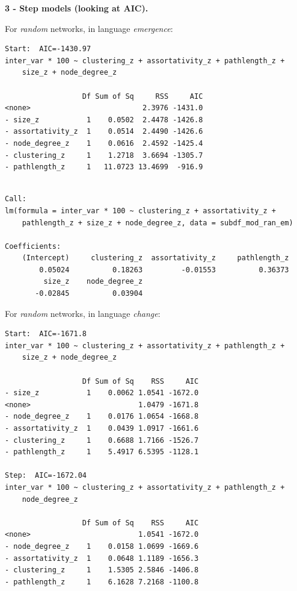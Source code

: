 \documentclass[
]{article}
\begin{document}
\textbf{3 - Step models (looking at AIC).}

For \emph{random} networks, in language \emph{emergence}:

\begin{verbatim}
Start:  AIC=-1430.97
inter_var * 100 ~ clustering_z + assortativity_z + pathlength_z + 
    size_z + node_degree_z

                  Df Sum of Sq     RSS     AIC
<none>                          2.3976 -1431.0
- size_z           1    0.0502  2.4478 -1426.8
- assortativity_z  1    0.0514  2.4490 -1426.6
- node_degree_z    1    0.0616  2.4592 -1425.4
- clustering_z     1    1.2718  3.6694 -1305.7
- pathlength_z     1   11.0723 13.4699  -916.9
\end{verbatim}

\begin{verbatim}

Call:
lm(formula = inter_var * 100 ~ clustering_z + assortativity_z + 
    pathlength_z + size_z + node_degree_z, data = subdf_mod_ran_em)

Coefficients:
    (Intercept)     clustering_z  assortativity_z     pathlength_z  
        0.05024          0.18263         -0.01553          0.36373  
         size_z    node_degree_z  
       -0.02845          0.03904  
\end{verbatim}

For \emph{random} networks, in language \emph{change}:

\begin{verbatim}
Start:  AIC=-1671.8
inter_var * 100 ~ clustering_z + assortativity_z + pathlength_z + 
    size_z + node_degree_z

                  Df Sum of Sq    RSS     AIC
- size_z           1    0.0062 1.0541 -1672.0
<none>                         1.0479 -1671.8
- node_degree_z    1    0.0176 1.0654 -1668.8
- assortativity_z  1    0.0439 1.0917 -1661.6
- clustering_z     1    0.6688 1.7166 -1526.7
- pathlength_z     1    5.4917 6.5395 -1128.1

Step:  AIC=-1672.04
inter_var * 100 ~ clustering_z + assortativity_z + pathlength_z + 
    node_degree_z

                  Df Sum of Sq    RSS     AIC
<none>                         1.0541 -1672.0
- node_degree_z    1    0.0158 1.0699 -1669.6
- assortativity_z  1    0.0648 1.1189 -1656.3
- clustering_z     1    1.5305 2.5846 -1406.8
- pathlength_z     1    6.1628 7.2168 -1100.8
\end{verbatim}
\end{document}
